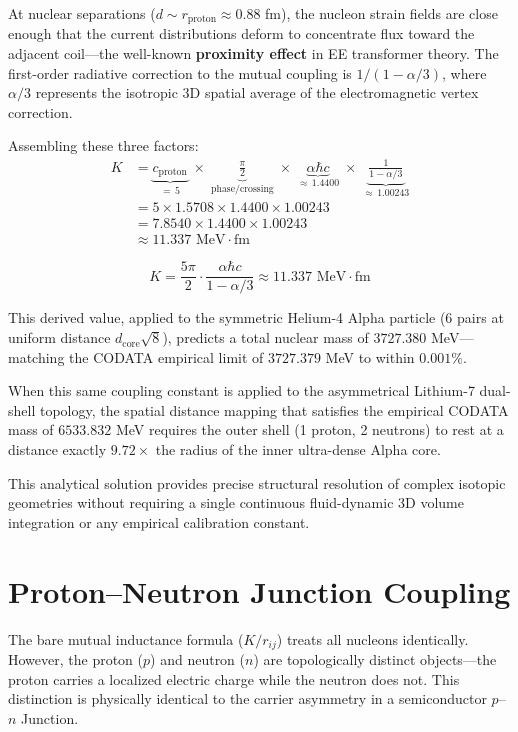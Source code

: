 At nuclear separations ($d \sim r_{\text{proton}} \approx 0.88$ fm), the nucleon strain fields are close enough that the current distributions deform to concentrate flux toward the adjacent coil---the well-known \textbf{proximity effect} in EE transformer theory. The first-order radiative correction to the mutual coupling is $1/(1 - \alpha/3)$, where $\alpha/3$ represents the isotropic 3D spatial average of the electromagnetic vertex correction.

Assembling these three factors:
\begin{align}
    K &= \underbrace{c_{\text{proton}}}_{= \, 5}
         \;\times\;
         \underbrace{\frac{\pi}{2}}_{\text{phase/crossing}}
         \;\times\;
         \underbrace{\alpha \hbar c}_{\approx\, 1.4400}
         \;\times\;
         \underbrace{\frac{1}{1 - \alpha/3}}_{\approx\, 1.00243}
    \nonumber\\[6pt]
    &= 5 \times 1.5708 \times 1.4400 \times 1.00243
    \nonumber\\[4pt]
    &= 7.8540 \times 1.4400 \times 1.00243
    \nonumber\\[4pt]
    &\approx 11.337 \text{ MeV}\cdot\text{fm}
    \label{eq:k_mutual_expanded}
\end{align}

\begin{equation}
    \boxed{K = \frac{5\pi}{2} \cdot \frac{\alpha \hbar c}{1 - \alpha/3} \approx 11.337 \text{ MeV}\cdot\text{fm}}
    \label{eq:k_mutual}
\end{equation}

This derived value, applied to the symmetric Helium-4 Alpha particle (6 pairs at uniform distance $d_{\text{core}}\sqrt{8}$), predicts a total nuclear mass of $3727.380$ MeV---matching the CODATA empirical limit of $3727.379$ MeV to within $0.001\%$.

When this same coupling constant is applied to the asymmetrical Lithium-7 dual-shell topology, the spatial distance mapping that satisfies the empirical CODATA mass of $6533.832$ MeV requires the outer shell (1 proton, 2 neutrons) to rest at a distance exactly $9.72\times$ the radius of the inner ultra-dense Alpha core.

This analytical solution provides precise structural resolution of complex isotopic geometries without requiring a single continuous fluid-dynamic 3D volume integration or any empirical calibration constant.

\section{Proton--Neutron Junction Coupling}
\label{sec:pn_junction}
The bare mutual inductance formula ($K/r_{ij}$) treats all nucleons identically. However, the proton ($p$) and neutron ($n$) are topologically distinct objects---the proton carries a localized electric charge while the neutron does not. This distinction is physically identical to the carrier asymmetry in a semiconductor $p$--$n$ Junction.

